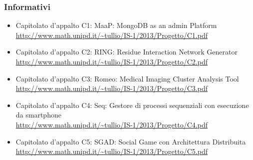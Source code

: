 	\subsubsection{Informativi}
	\begin{itemize}
		\item Capitolato d’appalto C1: MaaP: MongoDB as an admin Platform\\
			\url	{http://www.math.unipd.it/~tullio/IS-1/2013/Progetto/C1.pdf}
		\item Capitolato d’appalto C2: RING: Residue Interaction Network Generator\\
			\url{http://www.math.unipd.it/~tullio/IS-1/2013/Progetto/C2.pdf}
		\item Capitolato d’appalto C3: Romeo: Medical Imaging Cluster Analysis Tool\\
			\url{http://www.math.unipd.it/~tullio/IS-1/2013/Progetto/C3.pdf}
		\item Capitolato d’appalto C4: Seq: Gestore di processi sequenziali con esecuzione da smartphone\\
			\url{http://www.math.unipd.it/~tullio/IS-1/2013/Progetto/C4.pdf}
		\item Capitolato d’appalto C5: SGAD: Social Game con Architettura Distribuita\\
			\url{http://www.math.unipd.it/~tullio/IS-1/2013/Progetto/C5.pdf}
	\end{itemize}